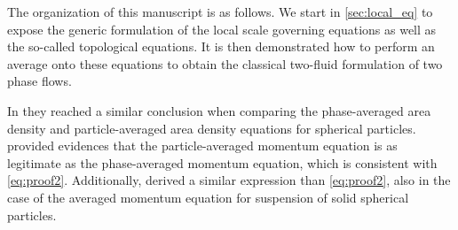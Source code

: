 The organization of this manuscript is as follows. 
We start in \ref{sec:local_eq} to expose the generic formulation of the local scale governing equations as well as the so-called topological equations. 
It is then demonstrated how to perform an average onto these equations to obtain the classical two-fluid formulation of two phase flows. 



In \cite{lhuillier2000bilan} they reached a similar conclusion when comparing the phase-averaged area density and particle-averaged area density equations for spherical particles. 
\citet[Appendix A]{zhang1997momentum} provided evidences that the particle-averaged momentum equation is as legitimate as the phase-averaged momentum equation, which is consistent with \ref{eq:proof2}. 
Additionally, \citet[Appendix A]{nott2011suspension} derived a similar expression than \ref{eq:proof2}, also in the case of the averaged momentum equation for suspension of solid spherical particles.